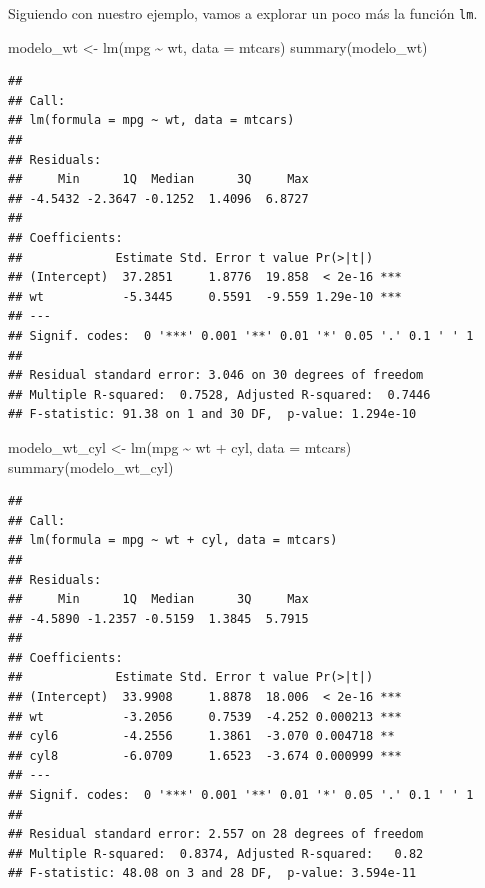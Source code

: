 \documentclass[
  12pt,
]{book}
\newenvironment{Shaded}{\begin{snugshade}}{\end{snugshade}}
\newcommand{\AttributeTok}[1]{\textcolor[rgb]{0.77,0.63,0.00}{#1}}
\newcommand{\FunctionTok}[1]{\textcolor[rgb]{0.00,0.00,0.00}{#1}}
\newcommand{\NormalTok}[1]{#1}
\newcommand{\OtherTok}[1]{\textcolor[rgb]{0.56,0.35,0.01}{#1}}
\newcommand{\SpecialCharTok}[1]{\textcolor[rgb]{0.00,0.00,0.00}{#1}}
\begin{document}
Siguiendo con nuestro ejemplo, vamos a explorar un poco más la función
\texttt{lm}.

\begin{Shaded}
\begin{Highlighting}[]
\NormalTok{modelo\_wt }\OtherTok{\textless{}{-}} \FunctionTok{lm}\NormalTok{(mpg }\SpecialCharTok{\textasciitilde{}}\NormalTok{ wt, }\AttributeTok{data =}\NormalTok{ mtcars)}
\FunctionTok{summary}\NormalTok{(modelo\_wt)}
\end{Highlighting}
\end{Shaded}

\begin{verbatim}
## 
## Call:
## lm(formula = mpg ~ wt, data = mtcars)
## 
## Residuals:
##     Min      1Q  Median      3Q     Max 
## -4.5432 -2.3647 -0.1252  1.4096  6.8727 
## 
## Coefficients:
##             Estimate Std. Error t value Pr(>|t|)    
## (Intercept)  37.2851     1.8776  19.858  < 2e-16 ***
## wt           -5.3445     0.5591  -9.559 1.29e-10 ***
## ---
## Signif. codes:  0 '***' 0.001 '**' 0.01 '*' 0.05 '.' 0.1 ' ' 1
## 
## Residual standard error: 3.046 on 30 degrees of freedom
## Multiple R-squared:  0.7528, Adjusted R-squared:  0.7446 
## F-statistic: 91.38 on 1 and 30 DF,  p-value: 1.294e-10
\end{verbatim}

\begin{Shaded}
\begin{Highlighting}[]
\NormalTok{modelo\_wt\_cyl }\OtherTok{\textless{}{-}} \FunctionTok{lm}\NormalTok{(mpg }\SpecialCharTok{\textasciitilde{}}\NormalTok{ wt }\SpecialCharTok{+}\NormalTok{ cyl, }\AttributeTok{data =}\NormalTok{ mtcars)}
\FunctionTok{summary}\NormalTok{(modelo\_wt\_cyl)}
\end{Highlighting}
\end{Shaded}

\begin{verbatim}
## 
## Call:
## lm(formula = mpg ~ wt + cyl, data = mtcars)
## 
## Residuals:
##     Min      1Q  Median      3Q     Max 
## -4.5890 -1.2357 -0.5159  1.3845  5.7915 
## 
## Coefficients:
##             Estimate Std. Error t value Pr(>|t|)    
## (Intercept)  33.9908     1.8878  18.006  < 2e-16 ***
## wt           -3.2056     0.7539  -4.252 0.000213 ***
## cyl6         -4.2556     1.3861  -3.070 0.004718 ** 
## cyl8         -6.0709     1.6523  -3.674 0.000999 ***
## ---
## Signif. codes:  0 '***' 0.001 '**' 0.01 '*' 0.05 '.' 0.1 ' ' 1
## 
## Residual standard error: 2.557 on 28 degrees of freedom
## Multiple R-squared:  0.8374, Adjusted R-squared:   0.82 
## F-statistic: 48.08 on 3 and 28 DF,  p-value: 3.594e-11
\end{verbatim}
\end{document}
